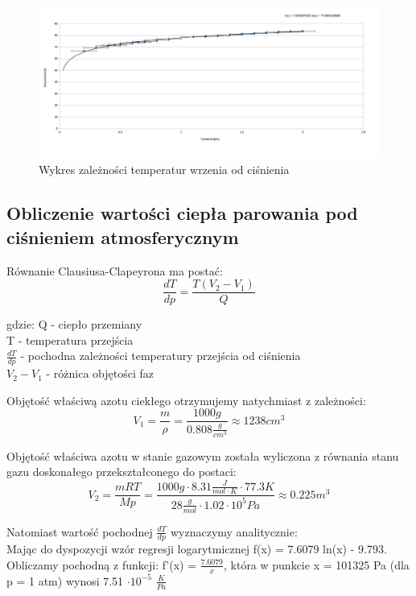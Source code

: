 \documentclass{article}
\begin{document}
\begin{figure}[h!]
\centering
\includegraphics[scale=0.31]{ch01}
\caption{Wykres zależności temperatur wrzenia od ciśnienia}
\end{figure}

\subsection{Obliczenie wartości ciepła parowania pod ciśnieniem atmosferycznym}

Równanie Clausiusa-Clapeyrona ma postać:
\begin{equation}
	\frac{dT}{dp} = \frac{T(V_{2}-V_{1})}{Q}
\end{equation}

gdzie:
Q - ciepło przemiany \\
T - temperatura przejścia \\
$\frac{dT}{dp}$ - pochodna zależności temperatury przejścia od ciśnienia \\ 
$V_{2}-V_{1}$ - różnica objętości faz

Objętość właściwą azotu ciekłego otrzymujemy natychmiast z zależności:
\begin{equation}
	V_1 = \frac{m}{\rho} = \frac{1000 g}{0.808 \frac{g}{cm^3}} \approx 1238 cm^3
\end{equation}

Objętość właściwa azotu w stanie gazowym została wyliczona z równania stanu gazu doskonałego przekształconego do postaci:
\begin{equation}
	V_2 = \frac{mRT}{Mp} = \frac{1000 g \cdot 8.31 \frac{J}{mol \cdot K } \cdot 77.3K}{28 \frac{g}{mol} \cdot 1.02 \cdot 10^5 Pa} \approx 0.225 m^3
\end{equation}

Natomiast wartość pochodnej $\frac{dT}{dp}$ wyznaczymy analitycznie:\\
Mając do dyspozycji wzór regresji logarytmicznej f(x) = 7.6079 ln(x) - 	9.793. Obliczamy pochodną z funkcji: f'(x) = $\frac{7.6079}{x}$, która w punkcie x = 101325 Pa (dla p = 1 atm) wynosi 7.51 $\cdot 10^{-5}$ $\frac{K}{Pa}$
\end{document}
